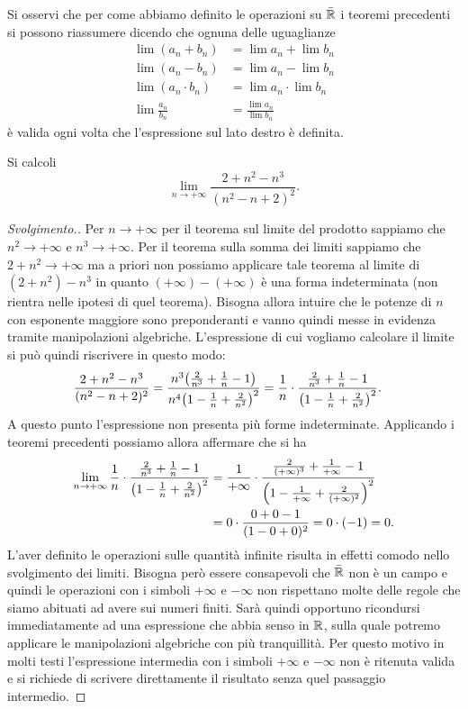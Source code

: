 Si osservi che
per come abbiamo definito le operazioni
su $\bar {\mathbb R}$
i teoremi precedenti si possono riassumere dicendo
che ognuna delle uguaglianze
\begin{align*}
\lim (a_n + b_n)
&= \lim a_n + \lim b_n \\
\lim (a_n - b_n)
&= \lim a_n - \lim b_n \\
\lim (a_n \cdot b_n)
&= \lim a_n \cdot \lim b_n \\
\lim \frac {a_n}{b_n}
&= \frac{\lim a_n}{\lim b_n}
\end{align*}
è valida ogni volta che l'espressione sul lato destro è definita.
%
\begin{example}
Si calcoli
\[
\lim_{n\to +\infty} \frac{2+n^2-n^3}{(n^2-n+2)^2}.
\]
\end{example}
\begin{proof}[Svolgimento.]
Per $n\to +\infty$ per il teorema sul limite del
prodotto sappiamo che $n^2\to +\infty$ e
$n^3\to +\infty$.
Per il teorema sulla somma dei limiti
sappiamo che $2+n^2\to +\infty$ ma
a priori non possiamo applicare tale teorema
al limite di $(2+n^2)-n^3$ in quanto
$(+\infty)-(+\infty)$ è una forma indeterminata
(non rientra nelle ipotesi di quel teorema).
Bisogna allora intuire che le potenze di $n$
con esponente maggiore sono preponderanti e vanno
quindi messe in evidenza tramite
manipolazioni algebriche. L'espressione
di cui vogliamo calcolare il limite
si può quindi riscrivere in questo modo:
\begin{align*}
\frac{2+n^2-n^3}{(n^2-n+2)^2}
&= \frac{n^3 {\left( \frac 2 {n^3}+\frac{1}{n}-1 \right)}}{n^4{\left( 1-\frac 1 n + \frac{2}{n^2} \right)}^2}
= \frac{1}{n}\cdot \frac{\frac 2 {n^3}+\frac{1}{n}-1}{{\left( 1-\frac 1 n + \frac{2}{n^2} \right)}^2}.
\end{align*}
A questo punto l'espressione non presenta più forme indeterminate.
Applicando i teoremi precedenti possiamo allora affermare che
si ha
\begin{align*}
\lim_{n\to+\infty}\frac{1}{n}\cdot \frac{\frac 2 {n^3}+\frac{1}{n}-1}{{\left( 1-\frac 1 n + \frac{2}{n^2} \right)}^2}
&= \frac{1}{+\infty} \cdot \frac{\frac 2 {(+\infty)^3}+\frac{1}{+\infty}-1}{{\left( 1-\frac 1 {+\infty} + \frac{2}{(+\infty)^2} \right)}^2}\\
&= 0 \cdot \frac{0+0-1}{(1-0+0)^2} = 0\cdot (-1) = 0.
\end{align*}
L'aver definito le operazioni sulle quantità infinite
risulta in effetti comodo nello svolgimento dei limiti.
Bisogna però essere consapevoli che $\bar {\mathbb R}$ non è un campo
e quindi le operazioni con i simboli $+\infty$ e $-\infty$
non rispettano molte delle regole che siamo abituati
ad avere sui numeri finiti.
Sarà quindi opportuno ricondursi immediatamente ad una espressione
che abbia senso in $\mathbb R$, sulla quale potremo
applicare le manipolazioni algebriche con più tranquillità.
Per questo motivo in molti testi l'espressione intermedia con
i simboli $+\infty$ e $-\infty$ non è ritenuta valida
e si richiede di scrivere direttamente il risultato senza
quel passaggio intermedio.
\end{proof}

